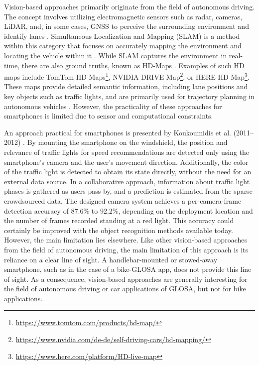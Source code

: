 Vision-based approaches primarily originate from the field of autonomous driving. The concept involves utilizing electromagnetic sensors such as radar, cameras, LiDAR, and, in some cases, GNSS to perceive the surrounding environment and identify lanes \cite{lee_avm_2017} \cite{sadli_map-matching-based_2022}. Simultaneous Localization and Mapping (SLAM) is a method within this category that focuses on accurately mapping the environment and locating the vehicle within it \cite{cheng_review_2022}. While SLAM captures the environment in real-time, there are also ground truths, known as HD-Maps \cite{kang_lane-level_2020}. Examples of such HD maps include TomTom HD Maps\footnote{\url{https://www.tomtom.com/products/hd-map/}}, NVIDIA DRIVE Map\footnote{\url{https://www.nvidia.com/de-de/self-driving-cars/hd-mapping/}}, or HERE HD Map\footnote{\url{https://www.here.com/platform/HD-live-map}}. These maps provide detailed semantic information, including lane positions and key objects such as traffic lights, and are primarily used for trajectory planning in autonomous vehicles \cite{yang_hdnet_2018}. However, the practicality of these approaches for smartphones is limited due to sensor and computational constraints.

An approach practical for smartphones is presented by Koukoumidis et al. (2011–2012) \cite{koukoumidis_signalguru_2011, koukoumidis_leveraging_2012}. By mounting the smartphone on the windshield, the position and relevance of traffic lights for speed recommendations are detected only using the smartphone's camera and the user's movement direction. Additionally, the color of the traffic light is detected to obtain its state directly, without the need for an external data source. In a collaborative approach, information about traffic light phases is gathered as users pass by, and a prediction is estimated from the sparse crowdsourced data. The designed camera system achieves a per-camera-frame detection accuracy of 87.6\% to 92.2\%, depending on the deployment location and the number of frames recorded standing at a red light. This accuracy could certainly be improved with the object recognition methods available today. However, the main limitation lies elsewhere. Like other vision-based approaches from the field of autonomous driving, the main limitation of this approach is its reliance on a clear line of sight. A handlebar-mounted or stowed-away smartphone, such as in the case of a bike-GLOSA app, does not provide this line of sight. As a consequence, vision-based approaches are generally interesting for the field of autonomous driving or car applications of GLOSA, but not for bike applications.

